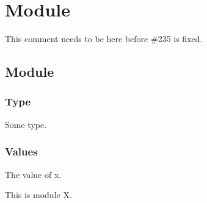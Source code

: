 \section{Module }\label{Nested}%
This comment needs to be here before \#235 is fixed.

\subsection{Module\label{Nested--module}}%
\label{Nested--module-X}\label{Nested-X}\begin{ocamlindent}\subsubsection{Type\label{Nested-X--type}}%
\label{Nested-X--type-t}\begin{ocamlindent}Some type.\end{ocamlindent}%
\medbreak
\subsubsection{Values\label{Nested-X--values}}%
\label{Nested-X--val-x}\begin{ocamlindent}The value of x.\end{ocamlindent}%
\medbreak
\end{ocamlindent}%
\begin{ocamlindent}This is module X.\end{ocamlindent}%
\medbreak
